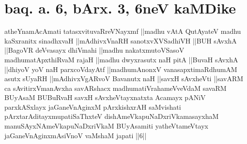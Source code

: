 \section{baq. a. 6, bArx. 3, 6neV kaMDike}


\begin{shl}
atheYnamAcAmati tatasxvituvaRreVNayxmf ||madhu vAtA QutAyateV madhu kaSxranitx sinadhxvaH ||mAdhivxVnaRH sanotxvXVSadhiVH ||BUH sAvxhA ||BagoVR deVvasayx dhiVmahi ||madhu nakatxmutoVSasoV madhumatApxthiRvaM rajaH ||madhu dwyxrasutx naH pitA ||BuvaH sAvxhA ||dhiyoV yoV naH parxcoVdayAtf ||madhumAnonxV vanasapxtimaRdhumAM asutx sUyaRH ||mAdhivxVgARvoV Bavanutx naH ||savxH sAvxheVti ||savARM ca sAvitirxVmanAvxha savARshacx madhumatiVrahameVveVdaM savaRM BUyAsaM BUBuRvaH savxH sAvxheVtayxnatxta Acamayx pANiV parxkASxlayx jaGaneVnAginxM pArxkishxrAH saMvishati pArxtarAditayxmupatiSaThxteV dishAmeVkapuNaDxriVkamasayxhaM manuSAyxNAmeVkapuNaDxriVkaM BUyAsamiti yatheVtameVtayx jaGaneVnAginxmAsiVnoV vaMshaM japati ||6||
\end{shl}	
